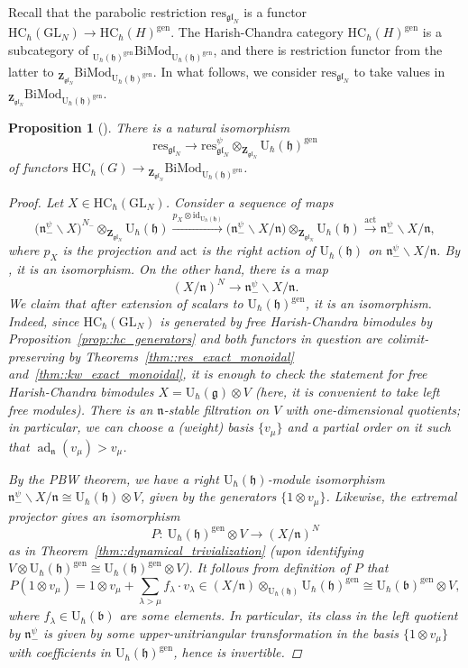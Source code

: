 \documentclass[pdftex]{sigma}
\numberwithin{equation}{section}
\newtheorem{Proposition}[Theorem]{Proposition}
{ \theoremstyle{definition}
	\newtheorem{Definition}[Theorem]{Definition}
	\newtheorem{Note}[Theorem]{Note}
	\newtheorem{Example}[Theorem]{Example}
	\newtheorem{Remark}[Theorem]{Remark} }
\newcommand{\U}{\mathrm{U}_{\hbar}}
\newcommand{\Z}{\mathbf{Z}}
\newcommand{\GL}{\mathrm{GL}}
\renewcommand{\b}{\mathfrak{b}}
\newcommand{\g}{\mathfrak{g}}
\newcommand{\h}{\mathfrak{h}}
\newcommand{\n}{\mathfrak{n}}
\newcommand{\act}{\mathrm{act}}
\DeclareMathOperator{\ad}{ad}
\newcommand{\BiMod}[2]{{}_{#1}\mathrm{BiMod}_{#2}}
\newcommand{\gen}{\mathrm{gen}}
\newcommand{\HC}{\mathrm{HC}_{\hbar}}
\newcommand{\id}{\mathrm{id}}
\newcommand{\res}{\mathrm{res}}
\newcommand{\gl}{\mathfrak{gl}}
\begin{document}
	Recall that the parabolic restriction $\res_{\gl_N}$ is a functor $\HC(\GL_N) \rightarrow \HC(H)^{\gen}$. The Harish-Chandra category $\HC(H)^{\gen}$ is a subcategory of $\BiMod{\U(\h)^{\gen}}{\U(\h)^{\gen}}$, and there is restriction functor from the latter to $\BiMod{\Z_{\gl_N}}{\U(\h)^{\gen}}$. In what follows, we consider $\res_{\gl_N}$ to take values in $\BiMod{\Z_{\gl_N}}{\U(\h)^{\gen}}$.
	\begin{Proposition}[{\cite[Corollary 2.7.7]{Kalmykov}}]
		\label{prop::two_res_iso}
		There is a natural isomorphism
		\[
		\res_{\gl_N} \rightarrow \res_{\gl_N}^{\psi} \otimes_{\Z_{\gl_N}} \U(\h)^{\gen}
		\]
		of functors $\HC(G) \rightarrow \BiMod{\Z_{\gl_N}}{\U(\h)^{\gen}}$.
		\begin{proof}
			Let $X\in \HC(\GL_N)$. Consider a sequence of maps
			\begin{equation}
				\label{eq::two_res_comp}
				\bigl(\n_-^{\psi} \backslash X\bigr)^{N_-} \otimes_{\Z_{\gl_N}} \U(\h) \xrightarrow{p_X \otimes \id_{\U(\h)}} \bigl(\n_-^{\psi} \backslash X / \n\bigr) \otimes_{\Z_{\gl_N}} \U(\h) \xrightarrow{\act} \n_-^{\psi} \backslash X / \n,
			\end{equation}
			where $p_X$ is the projection and $\act$ is the right action of $\U(\h)$ on $\n_-^{\psi} \backslash X / \n$. By \cite[Lemma~6.2.1]{GinzburgKazhdan}, it is an isomorphism. On the other hand, there is a map
			\begin{equation}
				\label{eq::two_res_invert}
				(X/\n)^{N} \rightarrow \n_-^{\psi} \backslash X / \n.
			\end{equation}
			We claim that after extension of scalars to $\U(\h)^{\gen}$, it is an isomorphism. Indeed, since $\HC(\GL_N)$ is generated by free Harish-Chandra bimodules by Proposition~\ref{prop::hc_generators} and both functors in question are colimit-preserving by Theorems~\ref{thm::res_exact_monoidal} and~\ref{thm::kw_exact_monoidal}, it is enough to check the statement for free Harish-Chandra bimodules $X = \U(\g) \otimes V$ (here, it is convenient to take \emph{left} free modules). There is an $\n$-stable filtration on $V$ with one-dimensional quotients; in particular, we can choose a (weight) basis $\{v_{\mu}\}$ and a partial order on it such that $\ad_{\n}(v_{\mu}) > v_{\mu}$.
			
			By the PBW theorem, we have a right $\U(\h)$-module isomorphism
$
			\n_-^{\psi} \backslash X /\n \cong \U(\h) \otimes V$,
			given by the generators $\{ 1\otimes v_{\mu}\}$. Likewise, the extremal projector gives an isomorphism
			\[
			P\colon\ \U(\h)^{\gen} \otimes V \rightarrow (X/\n)^{N}
			\]
			as in Theorem~\ref{thm::dynamical_trivialization} (upon identifying $V \otimes \U(\h)^{\gen} \cong \U(\h)^{\gen} \otimes V$). It follows from definition of $P$ that
			\[
			P(1\otimes v_{\mu}) = 1\otimes v_{\mu} + \sum_{\lambda > \mu} f_{\lambda} \cdot v_{\lambda} \in (X/\n) \otimes_{\U(\h)} \U(\h)^{\gen} \cong \U(\b)^{\gen} \otimes V,
			\]
			where $f_{\lambda} \in \U(\b)$ are some elements. In particular, its class in the left quotient by $\n_-^{\psi}$ is given by some upper-unitriangular transformation in the basis $\{1\otimes v_{\mu}\}$ with coefficients in $\U(\h)^{\gen}$, hence is invertible.
			

\end{proof}
\end{Proposition}
\end{document}
